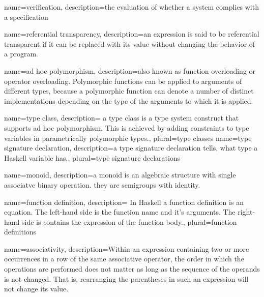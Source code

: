 {
name=verification,
description={the evaluation of whether a system complies with a specification}
}

{
name={referential transparency},
description={an expression is said to be referential transparent if it can be replaced with its value without changing the behavior of a program.}
}

{
name={ad hoc polymorphism},
description={also known as function overloading or operator overloading. Polymorphic functions can be applied to arguments of different types, because a polymorphic function can denote a number of distinct implementations depending on the type of the arguments to which it is applied.}
}

{
name={type class},
description={ a type class is a type system construct that supports ad hoc polymorphism. This is achieved by adding constraints to type variables in parametrically polymorphic types.},
plural={type classes}
}
{
name={type signature declaration},
description={a type signature declaration tells, what type a Haskell variable has.},
plural={type signature declarations}
}

{
name={monoid},
description={a monoid is an algebraic structure with single associatve binary operation. they are semigroups with identity.}
}

{
name={function definition},
description={ In Haskell a function definition is an equation. The left-hand side is the function name and it's arguments. The right-hand side is contains the expression of the function body.},
plural={function definitions}
}

{
name={associativity},
description={Within an expression containing two or more occurrences in a row of the same associative operator, the order in which the operations are performed does not matter as long as the sequence of the operands is not changed. That is, rearranging the parentheses in such an expression will not change its value.}
}

